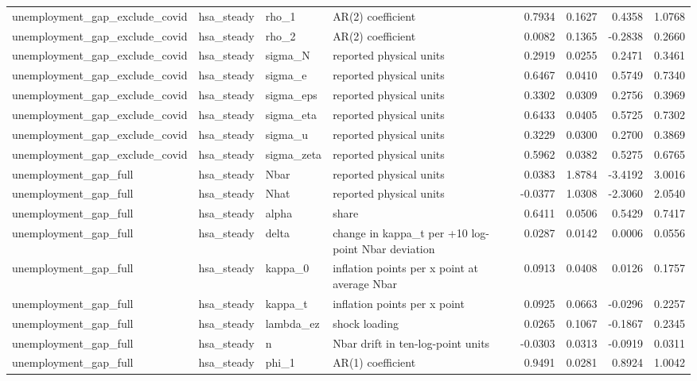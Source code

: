 \begin{tabular}{llllrrrr}
unemployment\_gap\_exclude\_covid & hsa\_steady & rho\_1 & AR(2) coefficient & 0.7934 & 0.1627 & 0.4358 & 1.0768 \\
unemployment\_gap\_exclude\_covid & hsa\_steady & rho\_2 & AR(2) coefficient & 0.0082 & 0.1365 & -0.2838 & 0.2660 \\
unemployment\_gap\_exclude\_covid & hsa\_steady & sigma\_N & reported physical units & 0.2919 & 0.0255 & 0.2471 & 0.3461 \\
unemployment\_gap\_exclude\_covid & hsa\_steady & sigma\_e & reported physical units & 0.6467 & 0.0410 & 0.5749 & 0.7340 \\
unemployment\_gap\_exclude\_covid & hsa\_steady & sigma\_eps & reported physical units & 0.3302 & 0.0309 & 0.2756 & 0.3969 \\
unemployment\_gap\_exclude\_covid & hsa\_steady & sigma\_eta & reported physical units & 0.6433 & 0.0405 & 0.5725 & 0.7302 \\
unemployment\_gap\_exclude\_covid & hsa\_steady & sigma\_u & reported physical units & 0.3229 & 0.0300 & 0.2700 & 0.3869 \\
unemployment\_gap\_exclude\_covid & hsa\_steady & sigma\_zeta & reported physical units & 0.5962 & 0.0382 & 0.5275 & 0.6765 \\
unemployment\_gap\_full & hsa\_steady & Nbar & reported physical units & 0.0383 & 1.8784 & -3.4192 & 3.0016 \\
unemployment\_gap\_full & hsa\_steady & Nhat & reported physical units & -0.0377 & 1.0308 & -2.3060 & 2.0540 \\
unemployment\_gap\_full & hsa\_steady & alpha & share & 0.6411 & 0.0506 & 0.5429 & 0.7417 \\
unemployment\_gap\_full & hsa\_steady & delta & change in kappa\_t per +10 log-point Nbar deviation & 0.0287 & 0.0142 & 0.0006 & 0.0556 \\
unemployment\_gap\_full & hsa\_steady & kappa\_0 & inflation points per x point at average Nbar & 0.0913 & 0.0408 & 0.0126 & 0.1757 \\
unemployment\_gap\_full & hsa\_steady & kappa\_t & inflation points per x point & 0.0925 & 0.0663 & -0.0296 & 0.2257 \\
unemployment\_gap\_full & hsa\_steady & lambda\_ez & shock loading & 0.0265 & 0.1067 & -0.1867 & 0.2345 \\
unemployment\_gap\_full & hsa\_steady & n & Nbar drift in ten-log-point units & -0.0303 & 0.0313 & -0.0919 & 0.0311 \\
unemployment\_gap\_full & hsa\_steady & phi\_1 & AR(1) coefficient & 0.9491 & 0.0281 & 0.8924 & 1.0042 \\

\end{tabular}
